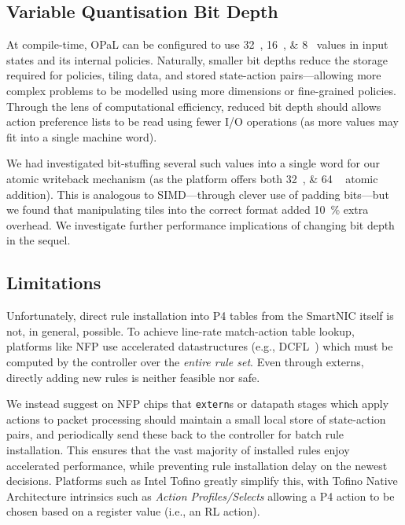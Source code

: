 \documentclass[sigconf,natbib=false]{acmart}
\newcommand{\approachshort}{OPaL}
\begin{document}
\subsection{Variable Quantisation Bit Depth}
At compile-time, \approachshort{} can be configured to use \SIlist[list-final-separator = { or }]{32;16;8}{\bit} values in input states and its internal policies.
Naturally, smaller bit depths reduce the storage required for policies, tiling data, and stored state-action pairs---allowing more complex problems to be modelled using more dimensions or fine-grained policies.
Through the lens of computational efficiency, reduced bit depth should allows action preference lists to be read using fewer I/O operations (as more values may fit into a single machine word).

We had investigated bit-stuffing several such values into a single word for our atomic writeback mechanism (as the platform offers both \SIlist{32;64
}{\bit} atomic addition).
This is analogous to SIMD---through clever use of padding bits---but we found that manipulating tiles into the correct format added \SI{10}{\percent} extra overhead.
We investigate further performance implications of changing bit depth in the sequel.

%
%
%

\subsection{Limitations}\label{sec:limitations}
Unfortunately, direct rule installation into P4 tables from the SmartNIC itself is not, in general, possible.
To achieve line-rate match-action table lookup, platforms like NFP use accelerated datastructures (e.g., DCFL~\parencite{DBLP:conf/infocom/TaylorT05}) which must be computed by the controller over the \emph{entire rule set}.
Even through externs, directly adding new rules is neither feasible nor safe.

We instead suggest on NFP chips that \texttt{extern}s or datapath stages which apply actions to packet processing should maintain a small local store of state-action pairs, and periodically send these back to the controller for batch rule installation.
This ensures that the vast majority of installed rules enjoy accelerated performance, while preventing rule installation delay on the newest decisions.
Platforms such as Intel Tofino greatly simplify this, with Tofino Native Architecture intrinsics such as \emph{Action Profiles/Selects} allowing a P4 action to be chosen based on a register value (i.e., an RL action).
\end{document}
